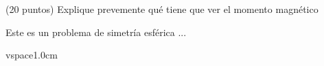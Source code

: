 \question [1] (20 puntos) Explique prevemente qué tiene que ver el momento magnético 

\begin{solution}
Este es un problema de simetría esférica ...



\end{solution}

vspace{1.0cm}
